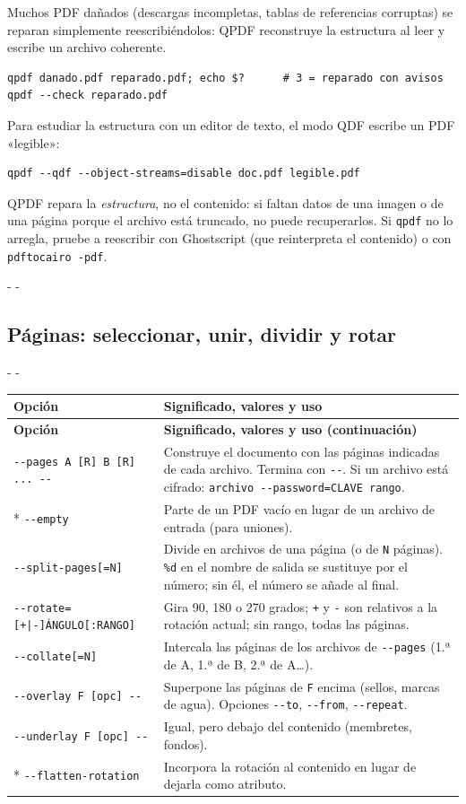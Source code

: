 \documentclass[11pt,a4paper]{article}
\makeatletter
\newcommand{\necesitaespacio}[1]{\par\penalty-100\begingroup
	\setlength{\dimen@}{#1}\dimen@ii\pagegoal\advance\dimen@ii-\pagetotal
	\ifdim\dimen@>\dimen@ii\ifdim\dimen@ii>\z@\vfil\fi\penalty-\@M\fi\endgroup}
\newenvironment{opciones}[1][Opción]{%
	\par\begingroup\small
	\begin{longtable}{L{4.25cm}L{11.2cm}}
		\toprule\rowcolor{tablacab}\cab{#1} & \cab{Significado, valores y uso} \\ \midrule
		\endfirsthead
		\toprule\rowcolor{tablacab}\cab{#1} & \cab{Significado, valores y uso (continuación)} \\ \midrule
		\endhead
		\bottomrule
		\endfoot}
	{\end{longtable}\endgroup}
\newcommand{\cmd}[1]{\texttt{\textcolor{colcmd}{#1}}}      %
\newcommand{\opt}[1]{\texttt{\textcolor{colopt}{#1}}}      %
\newcommand{\val}[1]{\texttt{#1}}                          %
\newcommand{\cab}[1]{\textbf{#1}}
\makeatother
\begin{document}
	Muchos PDF dañados (descargas incompletas, tablas de referencias corruptas) se reparan simplemente reescribiéndolos: QPDF reconstruye la estructura al leer y escribe un archivo coherente.
	
	\begin{lstlisting}
qpdf danado.pdf reparado.pdf; echo $?      # 3 = reparado con avisos
qpdf --check reparado.pdf
\end{lstlisting}
	
	Para estudiar la estructura con un editor de texto, el modo QDF escribe un PDF «legible»:
	
	\begin{lstlisting}
qpdf --qdf --object-streams=disable doc.pdf legible.pdf
\end{lstlisting}
	
	\begin{limitacion}
		QPDF repara la \emph{estructura}, no el contenido: si faltan datos de una imagen o de una página porque el archivo está truncado, no puede recuperarlos. Si \cmd{qpdf} no lo arregla, pruebe a reescribir con Ghostscript (que reinterpreta el contenido) o con \cmd{pdftocairo -pdf}.
	\end{limitacion}
	
	\necesitaespacio{30\baselineskip}
	\subsection{Páginas: seleccionar, unir, dividir y rotar}\label{sec:qpdf-paginas}
	
	\necesitaespacio{26\baselineskip}
	\begin{opciones}
		\opt{-{}-pages A [R] B [R] ... -{}-} & Construye el documento con las páginas indicadas de cada archivo. Termina con \opt{-{}-}. Si un archivo está cifrado: \val{archivo -{}-password=\allowbreak{}CLAVE rango}.\\*
		\opt{-{}-empty} & Parte de un PDF vacío en lugar de un archivo de entrada (para uniones).\\
		\opt{-{}-split-\allowbreak{}pages[=\allowbreak{}N]} & Divide en archivos de una página (o de \val{N} páginas). \val{\%d} en el nombre de salida se sustituye por el número; sin él, el número se añade al final.\\
		\opt{-{}-rotate=\allowbreak{}[+|\allowbreak{}-]ÁNGULO[:RANGO]} & Gira 90, 180 o 270 grados; \val{+} y \val{-} son relativos a la rotación actual; sin rango, todas las páginas.\\
		\opt{-{}-collate[=N]} & Intercala las páginas de los archivos de \opt{-{}-pages} (1.ª de A, 1.ª de B, 2.ª de A\ldots).\\
		\opt{-{}-overlay F [opc] -{}-} & Superpone las páginas de \val{F} encima (sellos, marcas de agua). Opciones \opt{-{}-to}, \opt{-{}-from}, \opt{-{}-repeat}.\\
		\opt{-{}-underlay F [opc] -{}-} & Igual, pero debajo del contenido (membretes, fondos).\\*
		\opt{-{}-flatten-\allowbreak{}rotation} & Incorpora la rotación al contenido en lugar de dejarla como atributo.\\
	\end{opciones}
	
\end{document}
